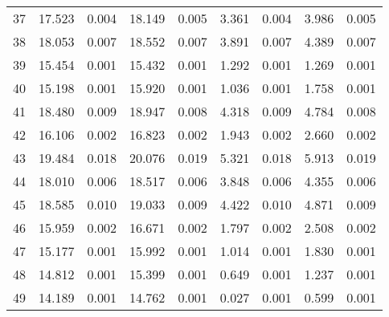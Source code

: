 \documentclass[10pt]{article}
\begin{document}
\begin{longtable}[c]{ccccc|cccc}
37 & \cellcolor{ gray!10 }  17.523 &  0.004 & \cellcolor{ gray!10 }  18.149 &  0.005 & \cellcolor{ gray!10 }  3.361 &  0.004 & \cellcolor{ gray!10 }  3.986 &  0.005 \\
38 & \cellcolor{ gray!10 }  18.053 &  0.007 & \cellcolor{ gray!10 }  18.552 &  0.007 & \cellcolor{ gray!10 }  3.891 &  0.007 & \cellcolor{ gray!10 }  4.389 &  0.007 \\
39 & \cellcolor{ gray!10 }  15.454 &  0.001 & \cellcolor{ gray!10 }  15.432 &  0.001 & \cellcolor{ gray!10 }  1.292 &  0.001 & \cellcolor{ gray!10 }  1.269 &  0.001 \\
40 & \cellcolor{ gray!10 }  15.198 &  0.001 & \cellcolor{ gray!10 }  15.920 &  0.001 & \cellcolor{ gray!10 }  1.036 &  0.001 & \cellcolor{ gray!10 }  1.758 &  0.001 \\
41 & \cellcolor{ gray!10 }  18.480 &  0.009 & \cellcolor{ gray!10 }  18.947 &  0.008 & \cellcolor{ gray!10 }  4.318 &  0.009 & \cellcolor{ gray!10 }  4.784 &  0.008 \\
42 & \cellcolor{ gray!10 }  16.106 &  0.002 & \cellcolor{ gray!10 }  16.823 &  0.002 & \cellcolor{ gray!10 }  1.943 &  0.002 & \cellcolor{ gray!10 }  2.660 &  0.002 \\
43 & \cellcolor{ gray!10 }  19.484 &  0.018 & \cellcolor{ gray!10 }  20.076 &  0.019 & \cellcolor{ gray!10 }  5.321 &  0.018 & \cellcolor{ gray!10 }  5.913 &  0.019 \\
44 & \cellcolor{ gray!10 }  18.010 &  0.006 & \cellcolor{ gray!10 }  18.517 &  0.006 & \cellcolor{ gray!10 }  3.848 &  0.006 & \cellcolor{ gray!10 }  4.355 &  0.006 \\
45 & \cellcolor{ gray!10 }  18.585 &  0.010 & \cellcolor{ gray!10 }  19.033 &  0.009 & \cellcolor{ gray!10 }  4.422 &  0.010 & \cellcolor{ gray!10 }  4.871 &  0.009 \\
46 & \cellcolor{ gray!10 }  15.959 &  0.002 & \cellcolor{ gray!10 }  16.671 &  0.002 & \cellcolor{ gray!10 }  1.797 &  0.002 & \cellcolor{ gray!10 }  2.508 &  0.002 \\
47 & \cellcolor{ gray!10 }  15.177 &  0.001 & \cellcolor{ gray!10 }  15.992 &  0.001 & \cellcolor{ gray!10 }  1.014 &  0.001 & \cellcolor{ gray!10 }  1.830 &  0.001 \\
48 & \cellcolor{ gray!10 }  14.812 &  0.001 & \cellcolor{ gray!10 }  15.399 &  0.001 & \cellcolor{ gray!10 }  0.649 &  0.001 & \cellcolor{ gray!10 }  1.237 &  0.001 \\
49 & \cellcolor{ gray!10 }  14.189 &  0.001 & \cellcolor{ gray!10 }  14.762 &  0.001 & \cellcolor{ gray!10 }  0.027 &  0.001 & \cellcolor{ gray!10 }  0.599 &  0.001 \\

\end{longtable}
\end{document}
